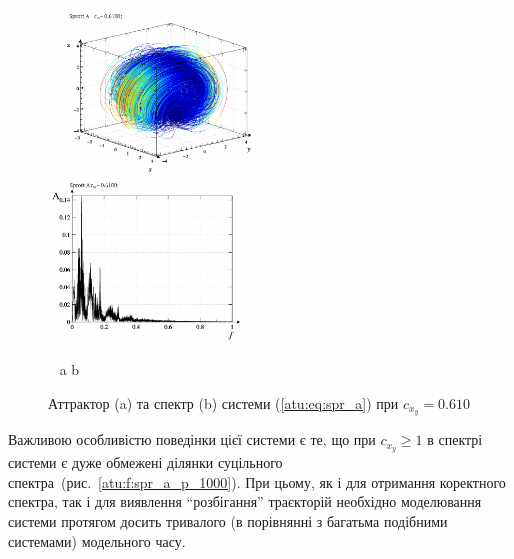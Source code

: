 \begin{figure}[htb!]
\begin{center}
  ~ \hfill
  \includegraphics[width=0.49\textwidth]{p/cha/spr_a/sprott_a-p_xyz_cx_y=0x610.png}
  \hfill
  \includegraphics[width=0.49\textwidth]{p/cha/spr_a/sprott_a_f-p_f_cx_y=0x610.png}
  \hfill ~
\end{center}
\vspace{-1.5ex}
\begin{center}
  ~ \hfill a \hfill\hfill b \hfill ~
\end{center}
\vspace{-2.0ex}
\caption{Аттрактор (a) та спектр (b) системи (\ref{atu:eq:spr_a}) при $c_{x_y} =0.610$}
\label{atu:f:spr_a_p_0610}
\end{figure}




Важливою особливістю поведінки цієї системи є те, що при
$c_{x_y} \ge 1$ в спектрі системи є дуже обмежені ділянки суцільного
спектра~(рис.~\ref{atu:f:spr_a_p_1000}). При цьому, як і для отримання
коректного спектра, так і для виявлення ``розбігання'' траєкторій
необхідно моделювання системи протягом досить тривалого (в
порівнянні з багатьма подібними системами) модельного часу.

